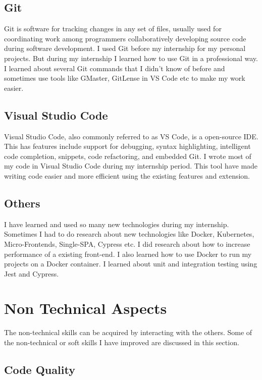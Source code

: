 \subsection{Git}

Git is software for tracking changes in any set of files, usually used for coordinating work among programmers collaboratively developing source code during software development.
I used Git before my internship for my personal projects.
But during my internship I learned how to use Git in a professional way.
I learned about several Git commands that I didn't know of before and sometimes use tools like GMaster, GitLense in VS Code etc to make my work easier.

\subsection{Visual Studio Code}

Visual Studio Code, also commonly referred to as VS Code, is a open-source IDE.
This has features include support for debugging, syntax highlighting, intelligent code completion, snippets, code refactoring, and embedded Git.
I wrote most of my code in Visual Studio Code during my internship period.
This tool have made writing code easier and more efficient using the existing features and extension.

\subsection{Others}

I have learned and used so many new technologies during my internship.
Sometimes I had to do research about new technologies like Docker, Kubernetes, Micro-Frontends, Single-SPA, Cypress etc.
I did research about how to increase performance of a existing front-end.
I also learned how to use Docker to run my projects on a Docker container.
I learned about unit and integration testing using Jest and Cypress.


\section{Non Technical Aspects}

The non-technical skills can be acquired by interacting with the others.
Some of the non-technical or soft skills I have improved are discussed in this section.

\subsection{Code Quality}

